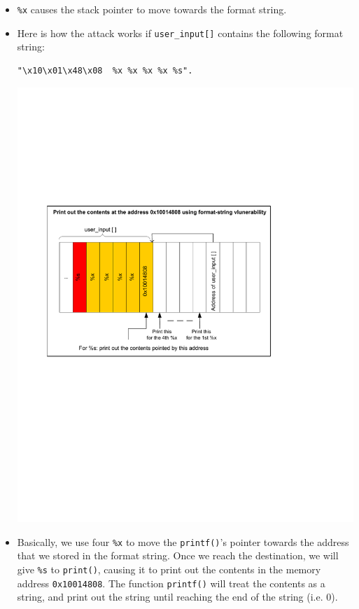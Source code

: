 \begin{itemize}
   \item {\tt \%x}  causes the stack pointer to move towards the format string.

   \item Here is how the attack works if {\tt user\_input[]} contains the
         following format string:

\begin{verbatim}      
"\x10\x01\x48\x08  %x %x %x %x %s".
\end{verbatim}
\begin{center}
\includegraphics*[viewport=0.6in 4.10in 6.5in 8.1in,width=5.5in]{Figs/Format_String_Attack.pdf}
\end{center}

   \item Basically, we use four \verb|%x| to move the {\tt printf()}'s pointer
         towards the address that we stored in the format string. Once we reach
         the destination, we will give \verb|%s| to {\tt print()}, causing it
         to print out the contents in the memory address \verb|0x10014808|.
         The function {\tt printf()} will treat the contents as a string, and
         print out the string until reaching the end of the string (i.e.  0).


\end{itemize}
